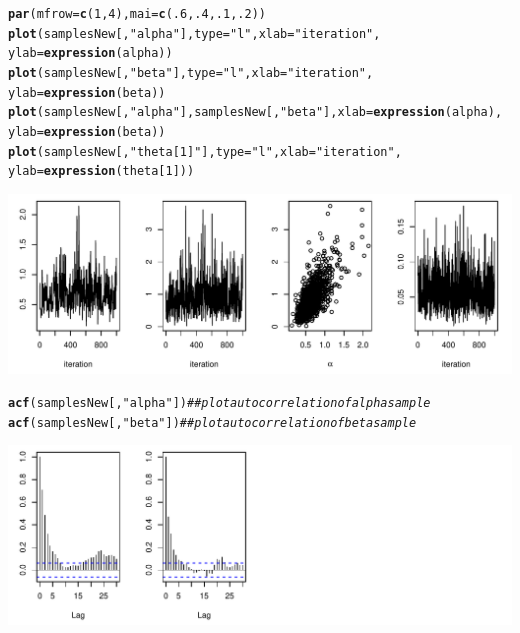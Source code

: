 \documentclass[12pt,oneside]{book}\usepackage[]{graphicx}\usepackage[]{color}
\makeatletter
\def\maxwidth{ %
  \ifdim\Gin@nat@width>\linewidth
    \linewidth
  \else
    \Gin@nat@width
  \fi
}
\newcommand{\hlnum}[1]{\textcolor[rgb]{0.686,0.059,0.569}{#1}}%
\newcommand{\hlstr}[1]{\textcolor[rgb]{0.192,0.494,0.8}{#1}}%
\newcommand{\hlcom}[1]{\textcolor[rgb]{0.678,0.584,0.686}{\textit{#1}}}%
\newcommand{\hlstd}[1]{\textcolor[rgb]{0.345,0.345,0.345}{#1}}%
\newcommand{\hlkwc}[1]{\textcolor[rgb]{0.333,0.667,0.333}{#1}}%
\newcommand{\hlkwd}[1]{\textcolor[rgb]{0.737,0.353,0.396}{\textbf{#1}}}%
\newenvironment{kframe}{%
 \def\at@end@of@kframe{}%
 \ifinner\ifhmode%
  \def\at@end@of@kframe{\end{minipage}}%
  \begin{minipage}{\columnwidth}%
 \fi\fi%
 \def\FrameCommand##1{\hskip\@totalleftmargin \hskip-\fboxsep
 \colorbox{shadecolor}{##1}\hskip-\fboxsep
     \hskip-\linewidth \hskip-\@totalleftmargin \hskip\columnwidth}%
 \MakeFramed {\advance\hsize-\width
   \@totalleftmargin\z@ \linewidth\hsize
   \@setminipage}}%
 {\par\unskip\endMakeFramed%
 \at@end@of@kframe}
\newenvironment{knitrout}{}{} %
\makeatother
\begin{document}
\begin{knitrout}
\begin{kframe}
\begin{alltt}
\hlkwd{par}\hlstd{(}\hlkwc{mfrow} \hlstd{=} \hlkwd{c}\hlstd{(}\hlnum{1}\hlstd{,} \hlnum{4}\hlstd{),} \hlkwc{mai} \hlstd{=} \hlkwd{c}\hlstd{(}\hlnum{.6}\hlstd{,} \hlnum{.4}\hlstd{,} \hlnum{.1}\hlstd{,} \hlnum{.2}\hlstd{))}
\hlkwd{plot}\hlstd{(samplesNew[ ,} \hlstr{"alpha"}\hlstd{],} \hlkwc{type} \hlstd{=} \hlstr{"l"}\hlstd{,} \hlkwc{xlab} \hlstd{=} \hlstr{"iteration"}\hlstd{,}
     \hlkwc{ylab} \hlstd{=} \hlkwd{expression}\hlstd{(alpha))}
\hlkwd{plot}\hlstd{(samplesNew[ ,} \hlstr{"beta"}\hlstd{],} \hlkwc{type} \hlstd{=} \hlstr{"l"}\hlstd{,} \hlkwc{xlab} \hlstd{=} \hlstr{"iteration"}\hlstd{,}
     \hlkwc{ylab} \hlstd{=} \hlkwd{expression}\hlstd{(beta))}
\hlkwd{plot}\hlstd{(samplesNew[ ,} \hlstr{"alpha"}\hlstd{], samplesNew[ ,} \hlstr{"beta"}\hlstd{],} \hlkwc{xlab} \hlstd{=} \hlkwd{expression}\hlstd{(alpha),}
     \hlkwc{ylab} \hlstd{=} \hlkwd{expression}\hlstd{(beta))}
\hlkwd{plot}\hlstd{(samplesNew[ ,} \hlstr{"theta[1]"}\hlstd{],} \hlkwc{type} \hlstd{=} \hlstr{"l"}\hlstd{,} \hlkwc{xlab} \hlstd{=} \hlstr{"iteration"}\hlstd{,}
     \hlkwc{ylab} \hlstd{=} \hlkwd{expression}\hlstd{(theta[}\hlnum{1}\hlstd{]))}
\end{alltt}
\end{kframe}
\includegraphics[width=\maxwidth]{figure/mcmcPump2-1} 
\begin{kframe}\begin{alltt}
\hlkwd{acf}\hlstd{(samplesNew[,} \hlstr{"alpha"}\hlstd{])} \hlcom{## plot autocorrelation of alpha sample}
\hlkwd{acf}\hlstd{(samplesNew[,} \hlstr{"beta"}\hlstd{])}  \hlcom{## plot autocorrelation of beta  sample}
\end{alltt}
\end{kframe}
\includegraphics[width=\maxwidth]{figure/mcmcPump2-2} 

\end{knitrout}
\end{document}
